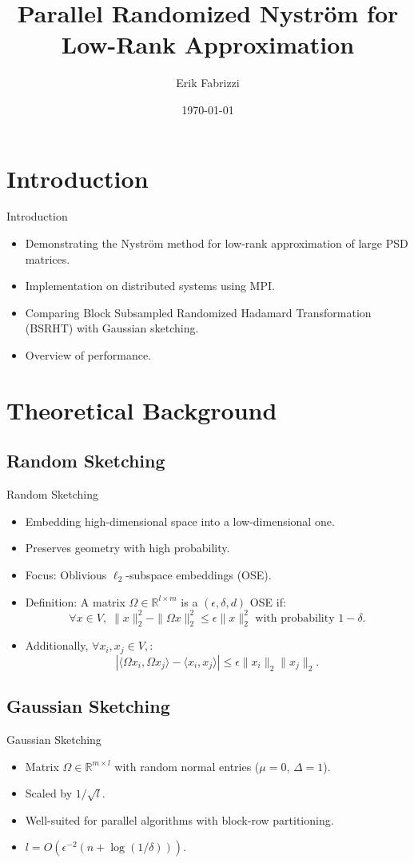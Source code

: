 \documentclass[aspectratio=169, xcolor=table]{beamer}
\title{Parallel Randomized Nystr\"om for Low-Rank Approximation}
\author{Erik Fabrizzi}
\institute{High Performance Computing for Numerical Methods and Data Analysis}
\date{\today}
\begin{document}
\frame{\titlepage}

\section{Introduction}
\begin{frame}{Introduction}
  \begin{itemize}
    \item Demonstrating the Nystr\"om method for low-rank approximation of large PSD matrices.
    \item Implementation on distributed systems using MPI.
    \item Comparing Block Subsampled Randomized Hadamard Transformation (BSRHT) with Gaussian sketching.
    \item Overview of performance.
  \end{itemize}
\end{frame}

\section{Theoretical Background}
\subsection{Random Sketching}
\begin{frame}{Random Sketching}
  \begin{itemize}
    \item Embedding high-dimensional space into a low-dimensional one.
    \item Preserves geometry with high probability.
    \item Focus: Oblivious $\ell_2$-subspace embeddings (OSE).
    \item Definition: A matrix $\Omega \in \mathbb{R}^{l \times m}$ is a $(\epsilon, \delta, d)$ OSE if:
      \[
      \forall x \in V, \; \|x\|_2^2 - \|\Omega x\|_2^2 \leq \epsilon \|x\|_2^2 \text{ with probability } 1-\delta.
      \]
    \item Additionally, $\forall x_i, x_j \in V,$:
      \[
      |\langle \Omega x_i, \Omega x_j \rangle - \langle x_i, x_j \rangle| \leq \epsilon \|x_i\|_2 \|x_j\|_2.
      \]
  \end{itemize}
\end{frame}

\subsection{Gaussian Sketching}
\begin{frame}{Gaussian Sketching}
  \begin{itemize}
    \item Matrix $\Omega \in \mathbb{R}^{m \times l}$ with random normal entries ($\mu = 0$, $\Delta = 1$).
    \item Scaled by $1/\sqrt{l}$.
    \item Well-suited for parallel algorithms with block-row partitioning.
    \item $l = O(\epsilon^{-2}(n + \log(1/\delta)))$.
  \end{itemize}
\end{frame}
\end{document}
